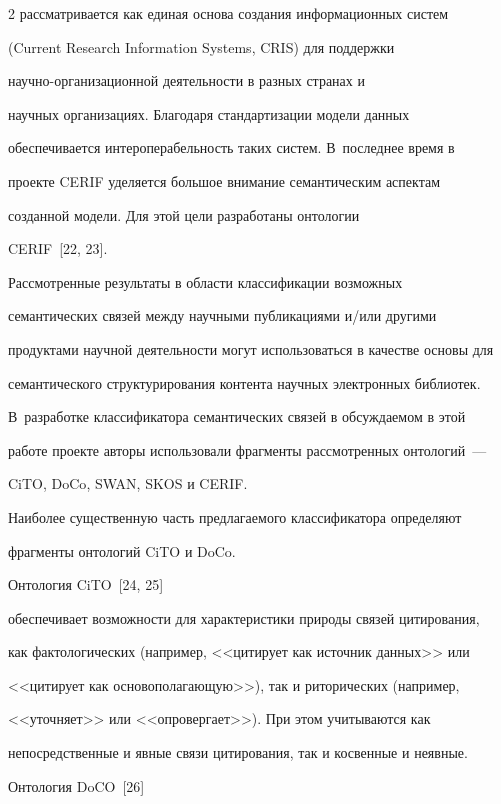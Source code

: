 \begin{multicols}{2}
рассматривается как единая основа создания информационных сис\-тем 


({Current Research Information Systems}, {CRIS}) для поддержки 


  на\-уч\-но-ор\-га\-ни\-за\-ци\-он\-ной деятельности в разных странах и 


научных организациях. Благодаря стандартизации модели данных 


обеспечивается интероперабельность таких систем. В~последнее время в 


проекте {CERIF} уделяется большое внимание семантическим аспектам 


созданной модели. Для этой цели разработаны онтологии 


{CERIF}~[22, 23].


  


  Рассмотренные результаты в области классификации возможных 


семантических связей между научными публикациями и/или другими 


продуктами научной деятельности могут использоваться в качестве основы для 


семантического структурирования контента научных электронных библиотек. 


В~разработке классификатора семантических связей в обсуждаемом в этой 


работе проекте авторы использовали фрагменты рассмотренных онтологий~--- 


{CiTO}, {DoCo}, {SWAN}, {SKOS} и {CERIF}. 


Наиболее существенную часть предлагаемого классификатора определяют 


фрагменты онтологий {CiTO} и {DoCo}. 


  


  Онтология {CiTO}~[24, 25] 


обеспечивает возможности для характеристики природы связей цитирования, 


как фактологических (например, <<цитирует как источник данных>> или 


<<цитирует как основополагающую>>), так и риторических (например, 


<<уточняет>> или <<опровергает>>). При этом учитываются как 


непосредственные и явные связи цитирования, так и косвенные и неявные. 


Онтология {DoCO}~[26] 



\end{multicols}
